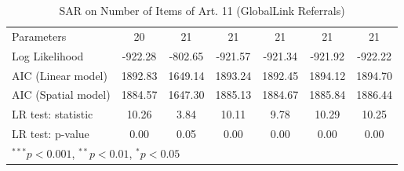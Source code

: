 \begin{table}[!h]
\begin{center}
\begin{tabular}{l c c c c c c }
Parameters              & 20           & 21           & 21           & 21           & 21           & 21           \\
Log Likelihood          & -922.28      & -802.65      & -921.57      & -921.34      & -921.92      & -922.22      \\
AIC (Linear model)      & 1892.83      & 1649.14      & 1893.24      & 1892.45      & 1894.12      & 1894.70      \\
AIC (Spatial model)     & 1884.57      & 1647.30      & 1885.13      & 1884.67      & 1885.84      & 1886.44      \\
LR test: statistic      & 10.26        & 3.84         & 10.11        & 9.78         & 10.29        & 10.25        \\
LR test: p-value        & 0.00         & 0.05         & 0.00         & 0.00         & 0.00         & 0.00         \\
\bottomrule
\multicolumn{7}{l}{\scriptsize{$^{***}p<0.001$, $^{**}p<0.01$, $^*p<0.05$}}
\end{tabular}
\caption{SAR on Number of Items of Art. 11 (GlobalLink Referrals)}
\label{table:coefficients}
\end{center}
\end{table}
